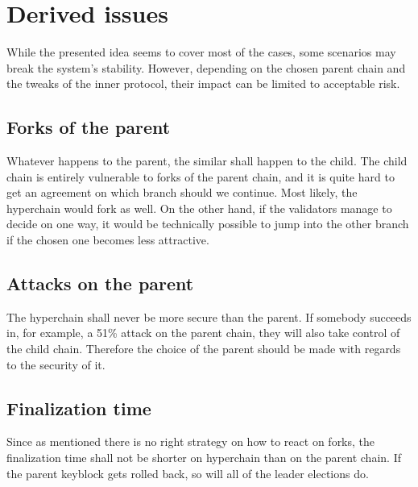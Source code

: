 \section{Derived issues}

While the presented idea seems to cover most of the cases, some
scenarios may break the system's stability. However, depending on the
chosen parent chain and the tweaks of the inner protocol, their impact
can be limited to acceptable risk.

\subsection{Forks of the parent}

Whatever happens to the parent, the similar shall happen to the child. The child
chain is entirely vulnerable to forks of the parent chain, and it is quite hard
to get an agreement on which branch should we continue. Most likely, the
hyperchain would fork as well. On the other hand, if the validators manage to
decide on one way, it would be technically possible to jump into the other
branch if the chosen one becomes less attractive.

\subsection{Attacks on the parent}

The hyperchain shall never be more secure than the parent.
If somebody succeeds in, for example, a 51\% attack on the parent chain,
they will also take control of the child chain.
Therefore the choice of the parent should be made with regards to the security of it.

\subsection{Finalization time}

Since as mentioned there is no right strategy on how to react on forks, the
finalization time shall not be shorter on hyperchain than on the parent chain.
If the parent keyblock gets rolled back, so will all of the leader elections do.
